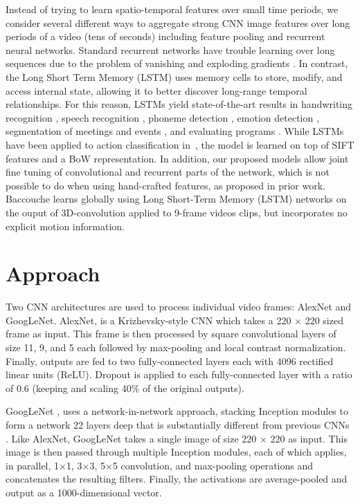 \documentclass[10pt,twocolumn,letterpaper]{article}
\begin{document}
Instead of trying to learn spatio-temporal features over small time
periods, we consider several different ways to aggregate strong CNN
image features over long periods of a video (tens of seconds)
including feature pooling and recurrent neural networks. Standard
recurrent networks have trouble learning over long sequences due to
the problem of vanishing and exploding gradients
\cite{bengio94learning}.
In contrast, the Long Short Term Memory
(LSTM) \cite{hochreiter97long} uses memory cells to store, modify, and
access internal state, allowing it to better discover long-range
temporal relationships. For this reason, LSTMs yield state-of-the-art
results in handwriting recognition \cite{graves09novel,
  graves08offline}, speech recognition \cite{graves13speech,
  graves14towards}, phoneme detection \cite{fernandez08phoneme},
emotion detection \cite{wollmer13lstm}, segmentation of meetings and
events \cite{reiter06combined}, and evaluating programs
\cite{zaremba14learning}. While LSTMs have been applied to action
classification in~\cite{Baccouche2010}, the model is learned on top of
SIFT features and a BoW representation. In addition, our proposed
models allow joint fine tuning of convolutional and recurrent parts of
the network, which is not possible to do when using hand-crafted
features, as proposed in prior work. Baccouche \etal\cite{Baccouche2010} learns globally using Long Short-Term Memory
(LSTM) networks on the ouput of 3D-convolution applied to 9-frame
videos clips, but incorporates no explicit motion information.


\section{Approach}\vspace{-1em}\label{sec:approach}%
Two CNN architectures are used to process individual video frames:
AlexNet and GoogLeNet. AlexNet, is a Krizhevsky-style CNN
\cite{krizhevsky2012imagenet} which takes a 220 $\times$ 220 sized
frame as input. This frame is then processed by square convolutional layers
of size 11, 9, and 5 each followed by max-pooling and local
contrast normalization. Finally, outputs are fed to two fully-connected layers
each with 4096 rectified linear units (ReLU).
 Dropout is applied to each fully-connected layer with a ratio of
 0.6 (keeping and scaling 40\% of the original outputs).


GoogLeNet \cite{szegedy14going}, uses a network-in-network approach,
stacking Inception modules to form a network 22 layers deep that is
substantially different from previous CNNs
\cite{krizhevsky2012imagenet, zeiler13visualizing}. Like AlexNet,
GoogLeNet takes a single image of size 220 $\times$ 220 as input. This
image is then passed through multiple Inception modules, each of which
applies, in parallel, 1$\times$1, 3$\times$3, 5$\times$5 convolution,
and max-pooling operations and concatenates the resulting
filters. Finally, the activations are average-pooled and output as a
1000-dimensional vector.
\end{document}
